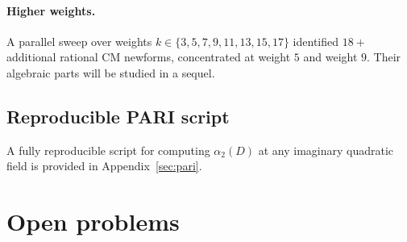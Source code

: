 \documentclass[12pt]{amsart}
\theoremstyle{definition}
\begin{document}
\paragraph{Higher weights.}
A parallel sweep over weights $k \in \{3, 5, 7, 9, 11, 13, 15, 17\}$
identified $18+$ additional rational CM newforms, concentrated at
weight $5$ and weight $9$.
Their algebraic parts will be studied in a sequel.

\subsection{Reproducible PARI script}

A fully reproducible script for computing $\alpha_2(D)$ at any imaginary
quadratic field is provided in Appendix~\ref{sec:pari}.

\section{Open problems}
\label{sec:open}
\end{document}
